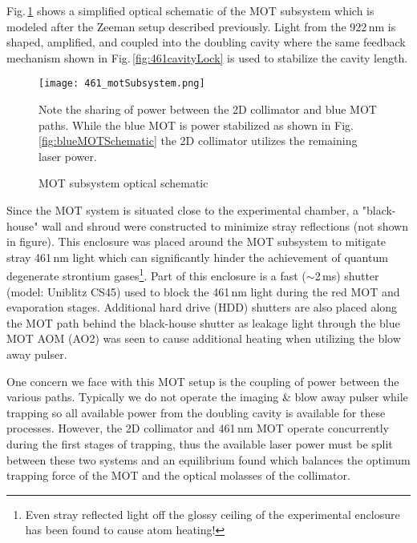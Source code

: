 Fig.\,\ref{fig:motSchematic} shows a simplified optical schematic of the MOT subsystem which is modeled after the Zeeman setup described previously.
Light from the 922\,nm is shaped, amplified, and coupled into the doubling cavity where the same feedback mechanism shown in Fig.\,\ref{fig:461cavityLock} is used to stabilize the cavity length.
	\begin{figure} 
		\centerline{
		\texttt{[image: 461\_motSubsystem.png]}}
		\caption{MOT subsystem optical schematic}{Note the sharing of power between the 2D collimator and blue MOT paths. While the blue MOT is power stabilized as shown in Fig.\,\ref{fig:blueMOTSchematic} the 2D collimator utilizes the remaining laser power.}
		\label{fig:motSchematic}
	\end{figure}
Since the MOT system is situated close to the experimental chamber, a "black-house" wall and shroud were constructed to minimize stray reflections (not shown in figure).
This enclosure was placed around the MOT subsystem to mitigate stray 461\,nm light which can significantly hinder the achievement of quantum degenerate strontium gases\footnote{Even stray reflected light off the glossy ceiling of the experimental enclosure has been found to cause atom heating!}.
Part of this enclosure is a fast ($\sim$2\,ms) shutter (model: Uniblitz CS45) used to block the 461\,nm light during the red MOT and evaporation stages.
Additional hard drive (HDD) shutters are also placed along the MOT path behind the black-house shutter as leakage light through the blue MOT AOM (AO2) was seen to cause additional heating when utilizing the blow away pulser.

One concern we face with this MOT setup is the coupling of power between the various paths.
Typically we do not operate the imaging \& blow away pulser while trapping so all available power from the doubling cavity is available for these processes.
However, the 2D collimator and 461\,nm MOT operate concurrently during the first stages of trapping, thus the available laser power must be split between these two systems and an equilibrium found which balances the optimum trapping force of the MOT and the optical molasses of the collimator.

